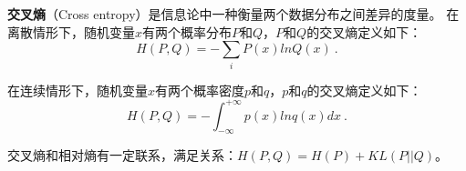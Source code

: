 
\begin{issues}
\issueDraft
\end{issues}


\textbf{交叉熵}（Cross entropy）是信息论中一种衡量两个数据分布之间差异的度量。
在离散情形下，随机变量$x$有两个概率分布$P$和$Q$，$P$和$Q$的交叉熵定义如下：
\begin{equation}
H(P,Q)=-\sum_iP(x)lnQ(x)~.
\end{equation}

在连续情形下，随机变量$x$有两个概率密度$p$和$q$，$p$和$q$的交叉熵定义如下：
\begin{equation}
H(P,Q)=- \int_{-\infty}^{+\infty}p(x)lnq(x)dx~.
\end{equation}

交叉熵和相对熵有一定联系，满足关系：$H(P,Q)=H(P)+KL(P||Q)$。